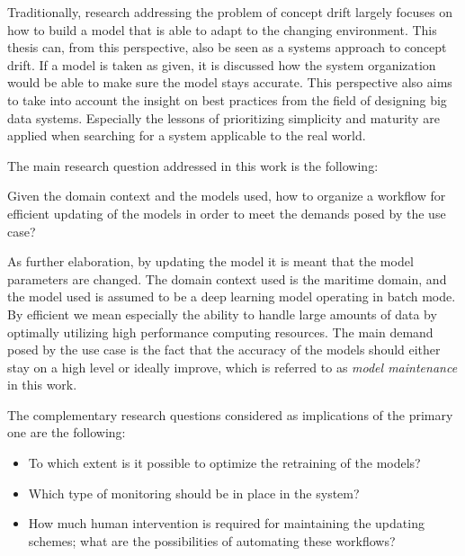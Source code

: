 Traditionally, research addressing the problem of concept drift largely focuses on how to build a model that is able to adapt to the changing environment. This thesis can, from this perspective, also be seen as a systems approach to concept drift. If a model is taken as given, it is discussed how the system organization would be able to make sure the model stays accurate. This perspective also aims to take into account the insight on best practices from the field of designing big data systems. Especially the lessons of prioritizing simplicity and maturity are applied when searching for a system applicable to the real world.




The main research question addressed in this work is the following:

\begin{center}
    Given the domain context and the models used, how to organize a workflow for efficient updating of the models in order to meet the demands posed by the use case?
\end{center}

As further elaboration, by updating the model it is meant that the model parameters are changed. The domain context used is the maritime domain, and the model used is assumed to be a deep learning model operating in batch mode. By efficient we mean especially the ability to handle large amounts of data by optimally utilizing high performance computing resources. The main demand posed by the use case is the fact that the accuracy of the models should either stay on a high level or ideally improve, which is referred to as \textit{model maintenance} in this work.

The complementary research questions considered as implications of the primary one are the following:

\begin{itemize}
    \item To which extent is it possible to optimize the retraining of the models?
    \item Which type of monitoring should be in place in the system?
    \item How much human intervention is required for maintaining the updating schemes; what are the possibilities of automating these workflows?
\end{itemize}

